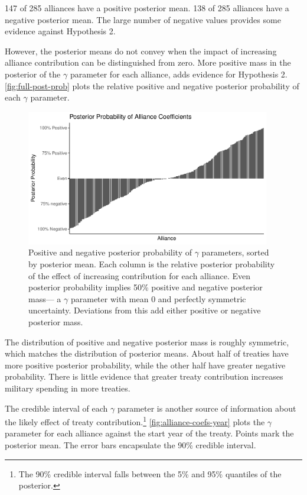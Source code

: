 \documentclass[12pt]{article}
\begin{document}
147 of 285 alliances have a positive posterior mean. 
138 of 285 alliances have a negative posterior mean. 
The large number of negative values provides some evidence against Hypothesis 2. 


However, the posterior means do not convey when the impact of increasing alliance contribution can be distinguished from zero. 
More positive mass in the posterior of the $\gamma$ parameter for each alliance, adds evidence for Hypothesis 2. 
\autoref{fig:full-post-prob} plots the relative positive and negative posterior probability of each $\gamma$ parameter. 

\begin{figure}[htbp]
	\centering
		\includegraphics[width=0.95\textwidth]{full-post-prob.pdf}
	\caption{Positive and negative posterior probability of $\gamma$ parameters, sorted by posterior mean. Each column is the relative posterior probability of the effect of increasing contribution for each alliance. Even posterior probability implies 50\% positive and negative posterior mass--- a $\gamma$ parameter with mean 0 and perfectly symmetric uncertainty. Deviations from this add either positive or negative posterior mass.}
	\label{fig:full-post-prob}
\end{figure}


The distribution of positive and negative posterior mass is roughly symmetric, which matches the distribution of posterior means. 
About half of treaties have more positive posterior probability, while the other half have greater negative probability. 
There is little evidence that greater treaty contribution increases military spending in more treaties. 


The credible interval of each $\gamma$ parameter is another source of information about the likely effect of treaty contribution.\footnote{The 90\% credible interval falls between the 5\% and 95\% quantiles of the posterior.} 
\autoref{fig:alliance-coefs-year} plots the $\gamma$ parameter for each alliance against the start year of the treaty.
Points mark the posterior mean. 
The error bars encapsulate the 90\% credible interval.
\end{document}
